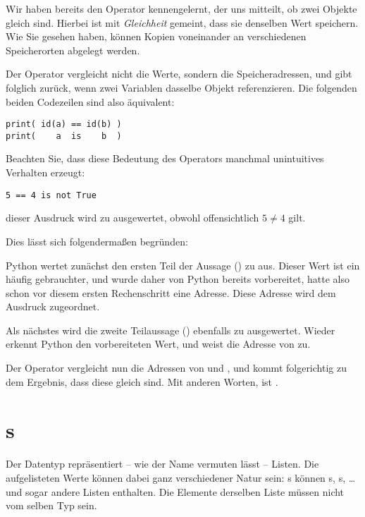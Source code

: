 \begin{hintbox}[Vergleichsoperator \texttt{is} vs. \texttt{==}]
Wir haben bereits den Operator \inPy{==} kennengelernt, der uns mitteilt, ob zwei Objekte gleich sind. Hierbei ist mit \emph{Gleichheit} gemeint, dass sie denselben Wert speichern. Wie Sie gesehen haben, können Kopien voneinander an verschiedenen Speicherorten abgelegt werden.

Der Operator  vergleicht nicht die Werte, sondern die Speicheradressen, und gibt folglich  zurück, wenn zwei Variablen dasselbe Objekt referenzieren. Die folgenden beiden Codezeilen sind also äquivalent:
\begin{codebox}
\begin{verbatim}
print( id(a) == id(b) )
print(    a  is    b  )
\end{verbatim}
\end{codebox}

Beachten Sie, dass diese Bedeutung des Operators  manchmal unintuitives Verhalten erzeugt:
\begin{warnbox}
\begin{verbatim}
5 == 4 is not True
\end{verbatim}
\end{warnbox}
dieser Ausdruck wird zu  ausgewertet, obwohl offensichtlich $5 \neq 4$ gilt.
\end{hintbox}
%
\begin{hintbox}[]
Dies lässt sich folgendermaßen begründen:

Python wertet zunächst den ersten Teil der Aussage () zu  aus. Dieser Wert ist ein häufig gebrauchter, und wurde daher von Python bereits vorbereitet, hatte also schon vor diesem ersten Rechenschritt eine Adresse. Diese Adresse wird dem Ausdruck  zugeordnet.

Als nächstes wird die zweite Teilaussage () ebenfalls zu  ausgewertet. Wieder erkennt Python den vorbereiteten Wert, und weist  die Adresse von  zu.

Der Operator  vergleicht nun die Adressen von  und , und kommt folgerichtig zu dem Ergebnis, dass diese gleich sind. Mit anderen Worten,  ist .
\end{hintbox}


\section{s}
Der Datentyp  repräsentiert -- wie der Name vermuten lässt -- Listen. Die aufgelisteten Werte können dabei ganz verschiedener Natur sein: s können s, s, \ldots und sogar andere Listen enthalten. Die Elemente derselben Liste müssen nicht vom selben Typ sein.


